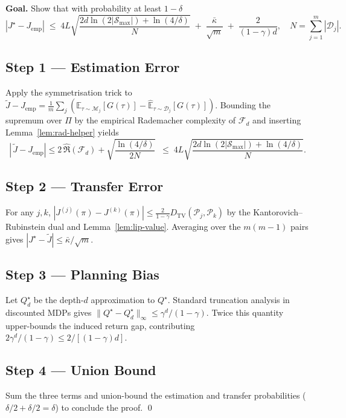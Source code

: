 \textbf{Goal.}\;
Show that with probability at least $1-\delta$
\[
|J^\star-J_{\mathrm{emp}}|
\;\le\;
4L\sqrt{\frac{2d\ln(2|\mathcal S_{\max}|)+\ln(4/\delta)}{N}}
\;+\;
\frac{\bar\kappa}{\sqrt m}
\;+\;
\frac{2}{(1-\gamma)d},
\quad
N=\!\!\sum_{j=1}^{m}\!|\mathcal D_j|.
\]

\subsection{Step 1 — Estimation Error}

Apply the symmetrisation trick to
$\tilde J-\!J_{\mathrm{emp}}
  =\frac1m\!\sum_{j}\!(\mathbb E_{\tau\!\sim\!\mathcal M_j}[G(\tau)]
                      -\widehat{\mathbb E}_{\tau\!\sim\!\mathcal D_j}[G(\tau)])$.
Bounding the supremum over $\Pi$ by the empirical Rademacher complexity of
$\mathcal F_d$ and inserting Lemma~\ref{lem:rad-helper} yields
\[
|\,\tilde J-J_{\mathrm{emp}}|\le
2\,\widehat{\mathfrak R}(\mathcal F_d)
  +\sqrt{\frac{\ln(4/\delta)}{2N}}
\;\;\le\;
4L\sqrt{\frac{2d\ln(2|\mathcal S_{\max}|)+\ln(4/\delta)}{N}} .
\]

\subsection{Step 2 — Transfer Error}

For any $j,k$,
$|J^{(j)}(\pi)-J^{(k)}(\pi)|
  \le \frac{2}{1-\gamma} D_{\mathrm{TV}}(\mathcal P_j,\mathcal P_k)$
by the Kantorovich–Rubinstein dual and Lemma~\ref{lem:lip-value}.
Averaging over the $m(m-1)$ pairs gives
\(
|J^\star-\tilde J|\le \bar\kappa/\sqrt m.
\)

\subsection{Step 3 — Planning Bias}

Let $Q^\star_d$ be the depth-$d$ approximation to $Q^\star$.
Standard truncation analysis in discounted MDPs gives
$\|Q^\star-Q^\star_d\|_\infty\le\gamma^{d}/(1-\gamma)$.
Twice this quantity upper-bounds the induced return gap, contributing
$2\gamma^{d}/(1-\gamma)\le 2/[(1-\gamma)d]$.

\subsection{Step 4 — Union Bound}

Sum the three terms and union-bound the estimation and transfer probabilities
($\delta/2+\delta/2=\delta$) to conclude the proof. \qed

